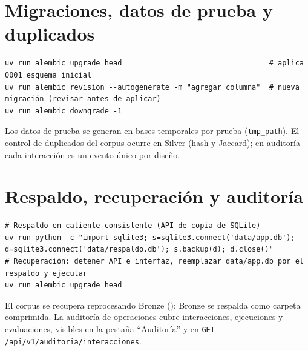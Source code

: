 \section{Migraciones, datos de prueba y duplicados}
\begin{lstlisting}[style=ps]
uv run alembic upgrade head                                  # aplica 0001_esquema_inicial
uv run alembic revision --autogenerate -m "agregar columna"  # nueva migración (revisar antes de aplicar)
uv run alembic downgrade -1
\end{lstlisting}
Los datos de prueba se generan en bases temporales por prueba (\texttt{tmp\_path}). El control de duplicados del
corpus ocurre en Silver (hash y Jaccard); en auditoría cada interacción es un evento único por diseño.

\section{Respaldo, recuperación y auditoría}
\begin{lstlisting}[style=ps]
# Respaldo en caliente consistente (API de copia de SQLite)
uv run python -c "import sqlite3; s=sqlite3.connect('data/app.db'); d=sqlite3.connect('data/respaldo.db'); s.backup(d); d.close()"
# Recuperación: detener API e interfaz, reemplazar data/app.db por el respaldo y ejecutar
uv run alembic upgrade head
\end{lstlisting}
El corpus se recupera reprocesando Bronze (); Bronze se respalda como
carpeta comprimida. La auditoría de operaciones cubre interacciones, ejecuciones y evaluaciones, visibles en la
pestaña ``Auditoría'' y en \texttt{GET /api/v1/auditoria/interacciones}.
